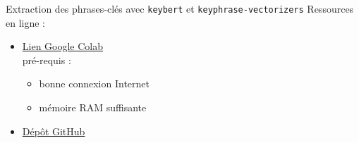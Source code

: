 \begin{frame}{Extraction des phrases-clés avec \texttt{keybert} et \texttt{keyphrase-vectorizers}}
Ressources en ligne :
\begin{itemize}
\item \href{https://colab.research.google.com/drive/1sBJP-lJcKZPgIqWzFRNfrBn3domuy1tP?usp=sharing}{Lien Google Colab}\\
pré-requis :
\begin{itemize}
\item bonne connexion Internet
\item mémoire RAM suffisante
\end{itemize}
\item \href{https://github.com/ljpetkovic/Charcot\_KeyBERT\_Keyphrase-Vectorizers?tab=readme-ov-file}{Dépôt GitHub}
\end{itemize}

\end{frame}

